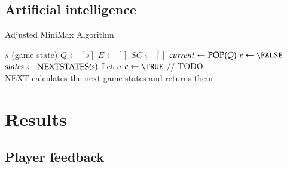 \documentclass[a4paper,american]{paper}
\theoremstyle{definition}\newtheorem{definition}{Definition}
\begin{document}
\subsection{Artificial intelligence}
\begin{algorithm}[H]
\caption{Adjusted MiniMax Algorithm}\label{alg:minimax}
\begin{algorithmic}
\Require $s$ (game state)
	\State $Q \gets [s]$
	\State $E \gets []$
	\State $SC \gets []$
		\State $current \gets \Call{POP}{Q}$
		\State $e \gets \FALSE$
		\State $states \gets \Call{NEXTSTATES}{s}$
		\State Let $n$
			\State {}
			\State $e \gets \TRUE$
						\State {}
					\EndIf
					\State {}
				\EndIf
			\EndFor
		\EndIf
			// TODO:
		\EndIf
	\EndWhile
\EndFunction\\
NEXT calculates the next game states and returns them
\end{algorithmic}
\end{algorithm}
\section{Results}
\subsection{Player feedback}

\nocite{*}

\end{document}
